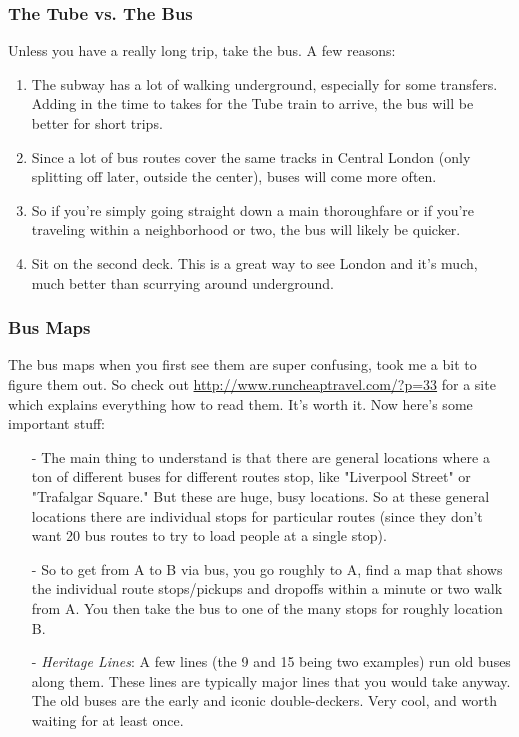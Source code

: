 \documentclass[a4paper,12pt]{scrartcl}
\begin{document}
\subsubsection{The Tube vs. The Bus} 
Unless you have a really long trip, take the bus. A few reasons:
\begin{enumerate}
   \item The subway has a lot of walking underground, especially for 
      some transfers. Adding in the time to takes for the Tube train
      to arrive, the bus will be better for short trips.
   \item Since a lot of bus routes cover the same tracks in Central
      London (only splitting off later, outside the center), buses
      will come more often.
   \item So if you're simply going straight down a main thoroughfare or 
      if you're traveling within a neighborhood or two, the bus
      will likely be quicker.
   \item Sit on the second deck.  This is a great way to see London
      and it's much, much better than scurrying around underground.
\end{enumerate}

\subsubsection{Bus Maps}
The bus maps when you first see them are super confusing, took
 me a bit to figure them out. So check out 
 \url{http://www.runcheaptravel.com/?p=33}
 for a site which explains everything how to read them. It's worth it.  
 Now here's some important stuff:
 \begin{itemize}
   \item[-] The main thing to understand is that there are general 
	  locations where a ton of different buses for different
	  routes stop, like  "Liverpool Street" or
	  "Trafalgar Square." But these are huge, busy locations.
	  So at these general locations there are individual
	  stops for particular routes (since they don't want 20 bus
	  routes to try to load people at a single stop).
   \item[-] So to get from A to B via bus, you go roughly to A, find
	  a map that shows the individual route stops/pickups and
	  dropoffs
	  within a minute or two walk from A. You then take the bus to
	  one of the many stops for roughly location B.
    \item[-] {\sl Heritage Lines}: A few lines (the 9 and 15 
	 being two examples)
	  run old buses along them. These lines are typically
	  major lines that you would take anyway. The old buses
	  are the early and iconic double-deckers. Very cool, and
	  worth waiting for at least once.	
\end{itemize}
\end{document}
